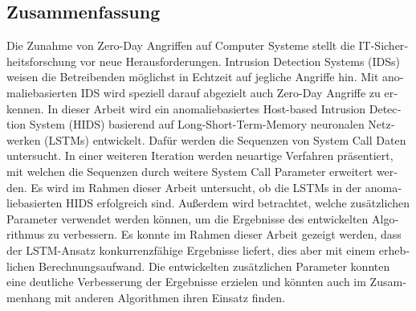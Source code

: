 \begin{otherlanguage}{ngerman}
\chapter*{Zusammenfassung}
Die Zunahme von Zero-Day Angriffen auf Computer Systeme stellt die IT-Sicherheitsforschung vor neue Herausforderungen.
Intrusion Detection Systems (IDSs) weisen die Betreibenden möglichst in Echtzeit auf jegliche Angriffe hin.
Mit anomaliebasierten IDS wird speziell darauf abgezielt auch Zero-Day Angriffe zu erkennen.
In dieser Arbeit wird ein anomaliebasiertes Host-based Intrusion Detection System (HIDS) basierend auf Long-Short-Term-Memory neuronalen Netzwerken (LSTMs) entwickelt.
Dafür werden die Sequenzen von System Call Daten untersucht.
In einer weiteren Iteration werden neuartige Verfahren präsentiert, mit welchen die Sequenzen durch weitere System Call Parameter erweitert werden.
Es wird im Rahmen dieser Arbeit untersucht, ob die LSTMs in der anomaliebasierten HIDS erfolgreich sind.
Außerdem wird betrachtet, welche zusätzlichen Parameter verwendet werden können, um die Ergebnisse des entwickelten Algorithmus zu verbessern.
Es konnte im Rahmen dieser Arbeit gezeigt werden, dass der LSTM-Ansatz konkurrenzfähige Ergebnisse liefert, dies aber mit einem erheblichen Berechnungsaufwand.
Die entwickelten zusätzlichen Parameter konnten eine deutliche Verbesserung der Ergebnisse erzielen und könnten auch im Zusammenhang mit anderen Algorithmen ihren Einsatz finden.
\end{otherlanguage}

\endgroup

\vfill
